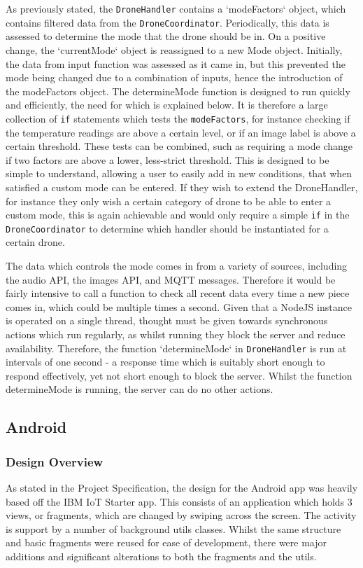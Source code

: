 \documentclass{article}
\begin{document}
As previously stated, the \texttt{DroneHandler} contains a `modeFactors` object, which contains filtered data from the \texttt{DroneCoordinator}. Periodically, this data is assessed to determine the mode that the drone should be in. On a positive change, the `currentMode` object is reassigned to a new Mode object. Initially, the data from input function was assessed as it came in, but this prevented the mode being changed due to a combination of inputs, hence the introduction of the modeFactors object. The determineMode function is designed to run quickly and efficiently, the need for which is explained below. It is therefore a large collection of \texttt{if} statements which tests the \texttt{modeFactors}, for instance checking if the temperature readings are above a certain level, or if an image label is above a certain threshold. These tests can be combined, such as requiring a mode change if two factors are above a lower, less-strict threshold. This is designed to be simple to understand, allowing a user to easily add in new conditions, that when satisfied a custom mode can be entered. If they wish to extend the DroneHandler, for instance they only wish a certain category of drone to be able to enter a custom mode, this is again achievable and would only require a simple \texttt{if} in the \texttt{DroneCoordinator} to determine which handler should be instantiated for a certain drone.

The data which controls the mode comes in from a variety of sources, including the audio API, the images API, and MQTT messages. Therefore it would be fairly intensive to call a function to check all recent data every time a new piece comes in, which could be multiple times a second. Given that a NodeJS instance is operated on a single thread, thought must be given towards synchronous actions which run regularly, as whilst running they block the server and reduce availability. Therefore, the function `determineMode` in \texttt{DroneHandler} is run at intervals of one second - a response time which is suitably short enough to respond effectively, yet not short enough to block the server. Whilst the function determineMode is running, the server can do no other actions.


\subsection{Android}
\subsubsection{Design Overview}
As stated in the Project Specification, the design for the Android app was heavily based off the IBM IoT Starter app\cite{iotStarterAndroid}. This consists of an application which holds 3 views, or fragments, which are changed by swiping across the screen. The activity is support by a number of background utils classes. Whilst the same structure and basic fragments were reused for ease of development, there were major additions and significant alterations to both the fragments and the utils. 
\end{document}
